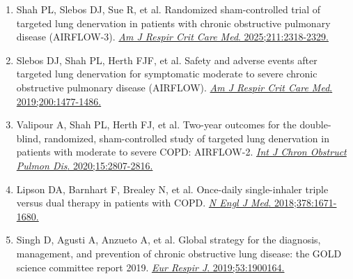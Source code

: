 \documentclass[12pt,a4paper]{article}
\begin{document}
\begin{enumerate}
    \item Shah PL, Slebos DJ, Sue R, et al. Randomized sham-controlled trial of targeted lung denervation in patients with chronic obstructive pulmonary disease (AIRFLOW-3). \href{https://doi.org/10.1164/rccm.202502-0404OC}{\textit{Am J Respir Crit Care Med}. 2025;211:2318-2329.}

    \item Slebos DJ, Shah PL, Herth FJF, et al. Safety and adverse events after targeted lung denervation for symptomatic moderate to severe chronic obstructive pulmonary disease (AIRFLOW). \href{https://doi.org/10.1164/rccm.201903-0624OC}{\textit{Am J Respir Crit Care Med}. 2019;200:1477-1486.}

    \item Valipour A, Shah PL, Herth FJ, et al. Two-year outcomes for the double-blind, randomized, sham-controlled study of targeted lung denervation in patients with moderate to severe COPD: AIRFLOW-2. \href{https://doi.org/10.2147/COPD.S267409}{\textit{Int J Chron Obstruct Pulmon Dis}. 2020;15:2807-2816.}

    \item Lipson DA, Barnhart F, Brealey N, et al. Once-daily single-inhaler triple versus dual therapy in patients with COPD. \href{https://doi.org/10.1056/NEJMoa1713901}{\textit{N Engl J Med}. 2018;378:1671-1680.}

    \item Singh D, Agusti A, Anzueto A, et al. Global strategy for the diagnosis, management, and prevention of chronic obstructive lung disease: the GOLD science committee report 2019. \href{https://doi.org/10.1183/13993003.00164-2019}{\textit{Eur Respir J}. 2019;53:1900164.}
\end{enumerate}
\end{document}
